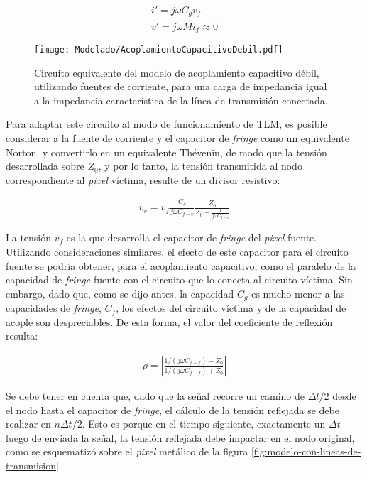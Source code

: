 \begin{subequations}
	\label{eq:expresiones-fuentes-controladas}
	\begin{align}
		i' = j \omega C_g v_f \\
		v' = j \omega M i_f \approx 0
	\end{align}
\end{subequations}

\begin{figure}[htp]
	\centering
	\texttt{[image: Modelado/AcoplamientoCapacitivoDebil.pdf]}
	\caption{Circuito equivalente del modelo de acoplamiento capacitivo débil, utilizando fuentes de corriente, para una carga de impedancia igual a la impedancia característica de la línea de transmisión conectada.}
	\label{fig:circuito-equivalente-acoplamiento-capacitivo-debil}
\end{figure}

Para adaptar este circuito al modo de funcionamiento de TLM, es posible considerar a la fuente de corriente y el capacitor de \textit{fringe} como un equivalente Norton, y convertirlo en un equivalente Thévenin, de modo que la tensión desarrollada sobre $Z_0$, y por lo tanto, la tensión transmitida al nodo correspondiente al \textit{pixel} víctima, resulte de un divisor resistivo:

\begin{align}
	v_v = v_f \frac{C_g}{j\omega C_{f-v}} \frac{Z_0}{Z_0 + \frac{1}{j\omega C_{f-v}}}
\end{align}


La tensión $v_f$ es la que desarrolla el capacitor de \textit{fringe} del \textit{pixel} fuente. Utilizando consideraciones similares, el efecto de este capacitor para el circuito fuente se podría obtener, para el acoplamiento capacitivo, como el paralelo de la capacidad de \textit{fringe} fuente con el circuito que lo conecta al circuito víctima. Sin embargo, dado que, como se dijo antes, la capacidad $C_g$ es mucho menor a las capacidades de \textit{fringe}, $C_{f}$, los efectos del circuito víctima y de la capacidad de acople son despreciables. De esta forma, el valor del coeficiente de reflexión resulta:

\begin{align}
	\rho =  \left| \frac{1/(j\omega C_{f-f}) - Z_0}{1/(j\omega C_{f-f}) + Z_0} \right|
\end{align}

Se debe tener en cuenta que, dado que la señal recorre un camino de $\Delta l / 2$ desde el nodo hasta el capacitor de \textit{fringe}, el cálculo de la tensión reflejada se debe realizar en $n\Delta t/2$. Esto es porque en el tiempo siguiente, exactamente un $\Delta t$ luego de enviada la señal, la tensión reflejada debe impactar en el nodo original, como se esquematizó sobre el \textit{pixel} metálico de la figura \ref{fig:modelo-con-lineas-de-transmision}.

